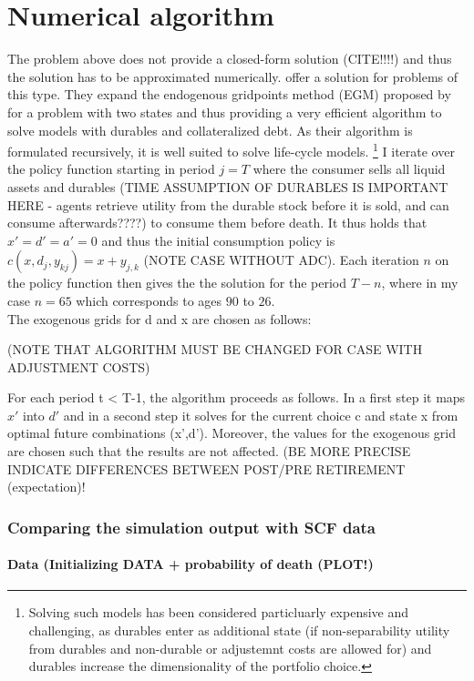 \documentclass[a4paper,12pt]{article}
\begin{document}
\section{Numerical algorithm}

The problem above does not provide a closed-form solution (CITE!!!!) and thus the solution has to be approximated numerically. \cite{hintermaier2010} offer a solution for problems of this type. They expand the endogenous gridpoints method (EGM) proposed by \cite{carroll2006} for a problem with two states and thus providing a very efficient algorithm to solve models with durables and collateralized debt. As their algorithm is formulated recursively, it is well suited to solve life-cycle models. \footnote{Solving such models has been considered particluarly expensive and challenging, as durables enter as additional state (if non-separability utility from durables and non-durable or adjustemnt costs are allowed for) and durables increase the dimensionality of the portfolio choice.\citep{hintermaier2010}} I iterate over the policy function starting in period $j = T$ where the consumer sells all liquid assets and durables (TIME ASSUMPTION OF DURABLES IS IMPORTANT HERE - agents retrieve utility from the durable stock before it is sold, and can consume afterwards????) to consume them before death. It thus holds that $x'=d'=a'=0$ and thus the initial consumption policy is $c(x,d_{j},y_{kj})=x+y_{j,k}$ (NOTE CASE WITHOUT ADC). Each iteration $n$ on the policy function then gives the the solution for the period $T-n$, where in my case $n=65$ which corresponds to ages $90$ to $26$. \\
The exogenous grids for d and x are chosen as follows: 

(NOTE THAT ALGORITHM MUST BE CHANGED FOR CASE WITH ADJUSTMENT COSTS)

For each period t < T-1, the algorithm proceeds as follows. In a first step it maps $x'$ into $d'$ and in a second step it solves for the current choice c and state x from optimal future combinations (x',d'). Moreover, the values for the exogenous grid are chosen such that the results are not affected. (BE MORE PRECISE
INDICATE DIFFERENCES BETWEEN POST/PRE RETIREMENT (expectation)!

\subsubsection{Comparing the simulation output with SCF data}

\paragraph{Data (Initializing DATA + probability of death (PLOT!)}
\end{document}
